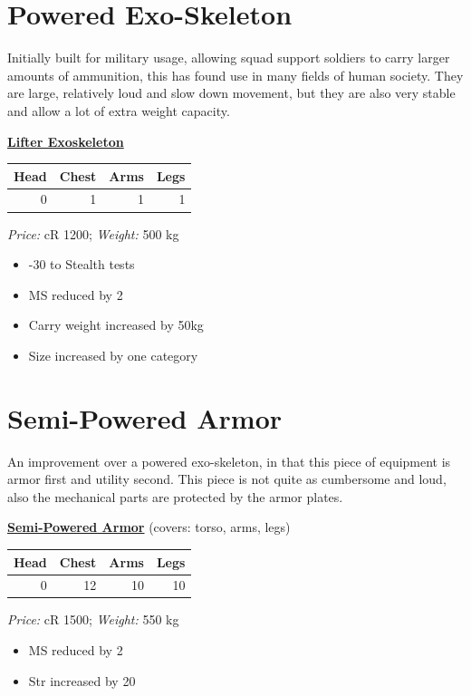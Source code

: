 \documentclass[12pt,a4paper,openany,usenames,dvipsnames]{book}
\begin{document}
	\section{Powered Exo-Skeleton}
	Initially built for military usage, allowing squad support soldiers to carry larger amounts of ammunition, this has found use in many fields of human society. They are large, relatively loud and slow down movement, but they are also very stable and allow a lot of extra weight capacity.
	\par
	\begin{minipage}{\columnwidth}
		\textbf{\ul{Lifter Exoskeleton}}\\
		\begin{tabular}{|r|r|r|r|}
			\hline
			Head & Chest & Arms & Legs\\
			\hline
			0 & 1 & 1 & 1\\
			\hline
		\end{tabular}\par
		\vspace{2mm}
		\textit{Price:} cR 1200; \textit{Weight:} 500 kg\\
		\begin{itemize}
			\item -30 to Stealth tests
			\item MS reduced by 2
			\item Carry weight increased by 50kg
			\item Size increased by one category
		\end{itemize}
	\end{minipage}
	\section{Semi-Powered Armor}
	An improvement over a powered exo-skeleton, in that this piece of equipment is armor first and utility second. This piece is not quite as cumbersome and loud, also the mechanical parts are protected by the armor plates.
	\par
	\begin{minipage}{\columnwidth}
		\textbf{\ul{Semi-Powered Armor}} (covers: torso, arms, legs)\\
		\begin{tabular}{|r|r|r|r|}
			\hline
			Head & Chest & Arms & Legs\\
			\hline
			0 & 12 & 10 & 10\\
			\hline
		\end{tabular}\par
		\vspace{2mm}
		\textit{Price:} cR 1500; \textit{Weight:} 550 kg\\
		\begin{itemize}
			\item MS reduced by 2
			\item Str increased by 20
		\end{itemize}
	\end{minipage}
\end{document}
